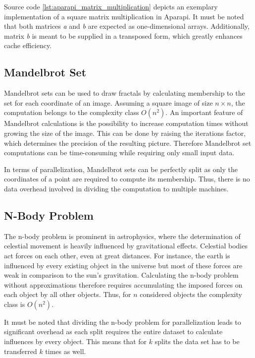 Source code \ref{lst:aparapi_matrix_multiplication} depicts an exemplary implementation of a square matrix multiplication in Aparapi. It must be noted that both matrices \textit{a} and \textit{b} are expected as one-dimensional arrays. Additionally, matrix \textit{b} is meant to be supplied in a transposed form, which greatly enhances cache efficiency.

\subsection*{Mandelbrot Set}

Mandelbrot sets can be used to draw fractals by calculating membership to the set for each coordinate of an image\cite{mandelbrot_article}. Assuming a square image of size $n\times n$, the computation belongs to the complexity class $O(n^2)$. An important feature of Mandelbrot calculations is the possibility to increase computation times without growing the size of the image. This can be done by raising the iterations factor, which determines the precision of the resulting picture. Therefore Mandelbrot set computations can be time-consuming while requiring only small input data.

In terms of parallelization, Mandelbrot sets can be perfectly split as only the coordinates of a point are required to compute its membership. Thus, there is no data overhead involved in dividing the computation to multiple machines.

\subsection*{N-Body Problem}

The n-body problem is prominent in astrophysics, where the determination of celestial movement is heavily influenced by gravitational effects\cite{nbody_article}. Celestial bodies act forces on each other, even at great distances. For instance, the earth is influenced by every existing object in the universe but most of these forces are weak in comparison to the sun's gravitation. Calculating the n-body problem without approximations therefore requires accumulating the imposed forces on each object by all other objects. Thus, for $n$ considered objects the complexity class is $O(n^2)$.

It must be noted that dividing the n-body problem for parallelization leads to significant overhead as each split requires the entire dataset to calculate influences by every object. This means that for $k$ splits the data set has to be transferred $k$ times as well.

